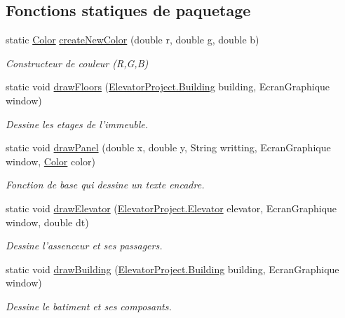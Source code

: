 \subsection*{Fonctions statiques de paquetage}
\begin{DoxyCompactItemize}
\item 
static \hyperlink{classGraphics_1_1Color}{Color} \hyperlink{classGraphics_af1f37200dbaa7377a0fad087b131685c}{create\-New\-Color} (double r, double g, double b)
\begin{DoxyCompactList}\small\item\em Constructeur de couleur (R,G,B) \end{DoxyCompactList}\item 
static void \hyperlink{classGraphics_acb95efd9ee6f8f7455ab34b4e7a5595f}{draw\-Floors} (\hyperlink{classElevatorProject_1_1Building}{Elevator\-Project.\-Building} building, Ecran\-Graphique window)
\begin{DoxyCompactList}\small\item\em Dessine les etages de l'immeuble. \end{DoxyCompactList}\item 
static void \hyperlink{classGraphics_ade1622c47ceb6de75f43263877c507be}{draw\-Panel} (double x, double y, String writting, Ecran\-Graphique window, \hyperlink{classGraphics_1_1Color}{Color} color)
\begin{DoxyCompactList}\small\item\em Fonction de base qui dessine un texte encadre. \end{DoxyCompactList}\item 
static void \hyperlink{classGraphics_a94fe503a2f1ce58fa72eac1b2a155a61}{draw\-Elevator} (\hyperlink{classElevatorProject_1_1Elevator}{Elevator\-Project.\-Elevator} elevator, Ecran\-Graphique window, double dt)
\begin{DoxyCompactList}\small\item\em Dessine l'assenceur et ses passagers. \end{DoxyCompactList}\item 
static void \hyperlink{classGraphics_a1ad76c2c5fada5a5469a0509a5290d9e}{draw\-Building} (\hyperlink{classElevatorProject_1_1Building}{Elevator\-Project.\-Building} building, Ecran\-Graphique window)
\begin{DoxyCompactList}\small\item\em Dessine le batiment et ses composants. \end{DoxyCompactList}\item 

\end{DoxyCompactItemize}
